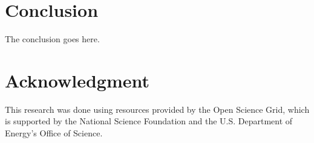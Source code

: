 \documentclass[conference]{IEEEtran}
\begin{document}



\section{Conclusion}
The conclusion goes here.






\section*{Acknowledgment}
This research was done using resources provided by the Open Science Grid, which is supported by the National Science Foundation and the U.S. Department of Energy's Office of Science.







%
%
%





\end{document}
